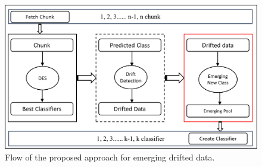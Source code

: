 \begin{figure}[ht]
	\centering
	\includegraphics[width=1\linewidth]{5_Emerging/images/pro1.png}
	\caption{Flow of the proposed approach for emerging drifted
	data.}
	\label{fig:proposal_step_1}
\end{figure}

